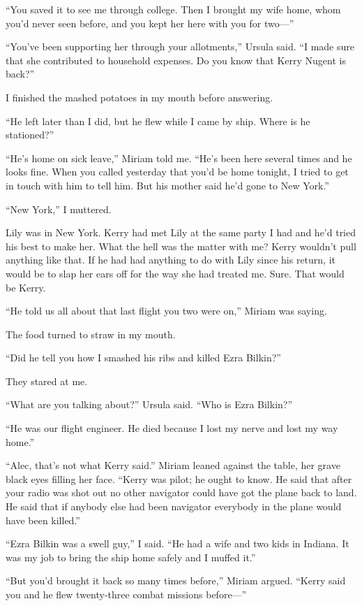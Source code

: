 \documentclass{novel}
\begin{document}
“You saved it to see me through college. Then I brought my wife home, whom you’d never seen before, and you kept her here with you for two—”

“You’ve been supporting her through your allotments,” Ursula said. “I made sure that she contributed to household expenses. Do you know that Kerry Nugent is back?”

I finished the mashed potatoes in my mouth before answering.

“He left later than I did, but he flew while I came by ship. Where is he stationed?”

“He’s home on sick leave,” Miriam told me. “He’s been here several times and he looks fine. When you called yesterday that you’d be home tonight, I tried to get in touch with him to tell him. But his mother said he’d gone to New York.”

“New York,” I muttered.

Lily was in New York. Kerry had met Lily at the same party I had and he’d tried his best to make her. What the hell was the matter with me? Kerry wouldn’t pull anything like that. If he had had anything to do with Lily since his return, it would be to slap her ears off for the way she had treated me. Sure. That would be Kerry.

“He told us all about that last flight you two were on,” Miriam was saying.

The food turned to straw in my mouth.

“Did he tell you how I smashed his ribs and killed Ezra Bilkin?”

They stared at me.

“What are you talking about?” Ursula said. “Who is Ezra Bilkin?”

“He was our flight engineer. He died because I lost my nerve and lost my way home.”

“Alec, that’s not what Kerry said.” Miriam leaned against the table, her grave black eyes filling her face. “Kerry was pilot; he ought to know. He said that after your radio was shot out no other navigator could have got the plane back to land. He said that if anybody else had been navigator everybody in the plane would have been killed.”

“Ezra Bilkin was a swell guy,” I said. “He had a wife and two kids in Indiana. It was my job to bring the ship home safely and I muffed it.”

“But you’d brought it back so many times before,” Miriam argued. “Kerry said you and he flew twenty-three combat missions before—”
\end{document}
